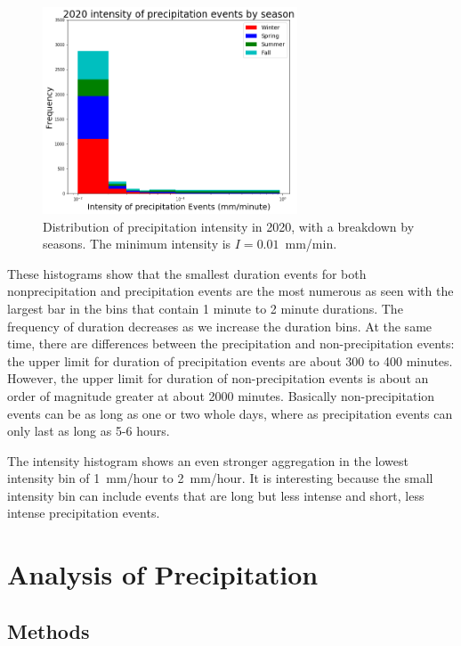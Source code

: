 \documentclass[11pt]{report}
\begin{document}
\begin{figure}[b]
	\centering
	\includegraphics[width=0.675\textwidth]{Figures/inten2020.png}
	\caption[Intensity histogram for 2020 broken down by season]
	{\label{i2020} Distribution of precipitation intensity in
		2020, with a breakdown by seasons. The minimum intensity is
		$I=0.01$~mm/min.}
\end{figure}
\clearpage

These histograms show that the smallest duration events for both
nonprecipitation and precipitation events are the most numerous as seen with
the largest bar in the bins that contain 1 minute to 2 minute durations. The
frequency of duration decreases as we increase the duration bins. At the
same time, there are differences between the precipitation and
non-precipitation events: the upper limit for duration of precipitation
events are about 300 to 400 minutes. However, the upper limit for duration
of non-precipitation events is about an order of magnitude greater at about
2000 minutes. Basically non-precipitation events can be as long as one or
two whole days, where as precipitation events can only last as long as 5-6
hours.

The intensity histogram shows an even stronger aggregation in the lowest
intensity bin of 1~mm/hour to 2~mm/hour. It is interesting because the small
intensity bin can include events that are long but less intense and short,
less intense precipitation events.

\section{Analysis of Precipitation}\label{sec:apc}


\subsection{Methods}\label{sec:methods}
\end{document}
